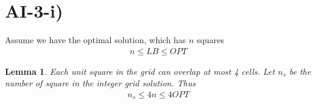 \section{AI-3-i)}
\label{approx-1-3-i}
\newtheorem{lem}[]{Lemma}

Assume we have the optimal solution, which has $n$ squares
\begin{align*}
    n \le LB \le OPT
\end{align*}

\begin{lem}
    Each unit square in the grid can overlap at most 4 cells.
Let $n_s$ be the number of square in the integer grid solution. Thus
    \begin{align*}
        n_s \le 4n \le 4OPT
    \end{align*}
\end{lem}
